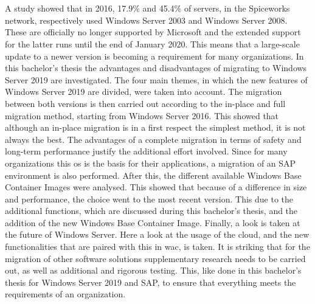\chapter*{}
A study showed that in 2016, 17.9\% and 45.4\% of servers, in the Spiceworks network, respectively used Windows Server 2003 and Windows Server 2008. \autocite{Tsai2016} 
These are officially no longer supported by Microsoft and the extended support for the latter runs until the end of January 2020. 
This means that a large-scale update to a newer version is becoming a requirement for many organizations. 
In this bachelor's thesis the advantages and disadvantages of migrating to Windows Server 2019 are investigated. 
The four main themes, in which the new features of Windows Server 2019 are divided, were taken into account. 
The migration between both versions is then carried out according to the in-place and full migration method, starting from Windows Server 2016. 
This showed that although an in-place migration is in a first respect the simplest method, it is not always the best. 
The advantages of a complete migration in terms of safety and long-term performance justify the additional effort involved.
Since for many organizations this \acrshort{os} is the basis for their applications, a migration of an SAP environment is also performed. 
After this, the different available Windows Base Container Images were analysed. 
This showed that because of a difference in size and performance, the choice went to the most recent version. 
This due to the additional functions, which are discussed during this bachelor's thesis, and the addition of the new Windows Base Container Image.
Finally, a look is taken at the future of Windows Server. 
Here a look at the usage of the cloud, and the new functionalities that are paired with this in \acrlong{wac}, is taken. 
It is striking that for the migration of other software solutions supplementary research needs to be carried out, as well as additional and rigorous testing. 
This, like done in this bachelor's thesis for Windows Server 2019 and SAP, to ensure that everything meets the requirements of an organization.